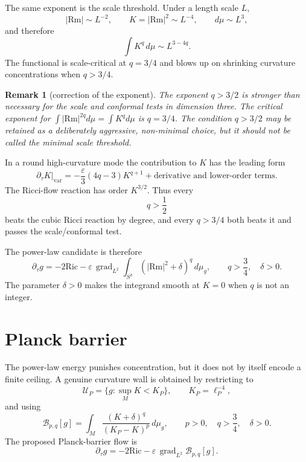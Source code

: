 \documentclass[11pt]{amsart}
\newtheorem{remark}{Remark}
\newcommand{\Rm}{\mathrm{Rm}}
\newcommand{\Ric}{\mathrm{Ric}}
\newcommand{\grad}{\operatorname{grad}}
\newcommand{\dmu}{\,d\mu_g}
\newcommand{\dt}{\partial_\tau}
\newcommand{\lP}{\ell_P}
\newcommand{\KP}{K_{\!P}}
\newcommand{\B}{\mathcal B}
\newcommand{\U}{\mathcal U}
\begin{document}
The same exponent is the scale threshold.  Under a length scale
\(L\),
\[
        |\Rm|\sim L^{-2},
        \qquad
        K=|\Rm|^2\sim L^{-4},
        \qquad
        d\mu\sim L^3,
\]
and therefore
\[
        \int K^q\,d\mu
        \sim
        L^{3-4q}.
\]
The functional is scale-critical at \(q=3/4\) and blows up on shrinking
curvature concentrations when \(q>3/4\).

\begin{remark}[correction of the exponent]
The exponent \(q>3/2\) is stronger than necessary for the scale and conformal
tests in dimension three.  The critical exponent for
\(\int |\Rm|^{2q}d\mu=\int K^q d\mu\) is \(q=3/4\).  The condition
\(q>3/2\) may be retained as a deliberately aggressive, non-minimal choice,
but it should not be called the minimal scale threshold.
\end{remark}

In a round high-curvature mode the contribution to \(K\) has the leading
form
\[
        \dt K\big|_{\mathrm{var}}
        =
        -\frac{\varepsilon}{3}(4q-3)K^{q+1}
        +\text{derivative and lower-order terms}.
\]
The Ricci-flow reaction has order \(K^{3/2}\).  Thus every
\[
        q>\frac12
\]
beats the cubic Ricci reaction by degree, and every \(q>3/4\) both beats it
and passes the scale/conformal test.

The power-law candidate is therefore
\[
        \boxed{
        \dt g
        =
        -2\Ric
        -
        \varepsilon\,\grad_{L^2}\int_{S^3} (|\Rm|^2+\delta)^q\,d\mu_g,
        \qquad
        q>\frac34,\quad \delta>0.
        }
\]
The parameter \(\delta>0\) makes the integrand smooth at \(K=0\) when \(q\)
is not an integer.

\section{Planck barrier}

The power-law energy punishes concentration, but it does not by itself encode
a finite ceiling.  A genuine curvature wall is obtained by restricting to
\[
        \U_P=\{g:\sup_M K<\KP\},
        \qquad
        \KP=\lP^{-4},
\]
and using
\[
        \B_{p,q}[g]
        =
        \int_M
        \frac{(K+\delta)^q}{(\KP-K)^p}\dmu,
        \qquad
        p>0,\quad q>\frac34,\quad \delta>0.
\]
The proposed Planck-barrier flow is
\[
        \boxed{
        \dt g
        =
        -2\Ric
        -
        \varepsilon\,\grad_{L^2}\B_{p,q}[g].
        }
\]
\end{document}
